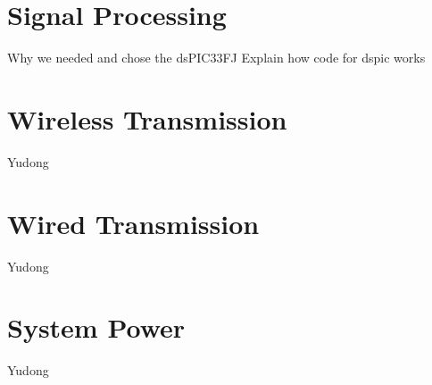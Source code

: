 \section{Signal Processing}
Why we needed and chose the dsPIC33FJ
Explain how code for dspic works

\section{Wireless Transmission}
Yudong

\section{Wired Transmission}
Yudong

\section{System Power}
Yudong